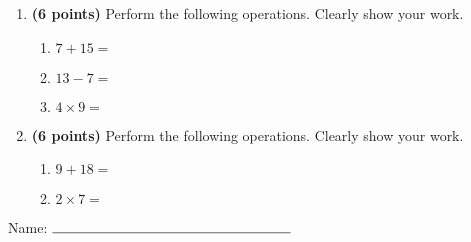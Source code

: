 \documentclass[12pt]{amsart}
\begin{document}
\newpage
\begin{enumerate}
\item {\bf (6 points)} 
 Perform the following operations. Clearly show your work. \begin{enumerate}


\def \a{7}\def \b{15}\def \apb{22}

 
\item $\a + \b = $

\vspace{2cm}
\def \a{13}\def \dif{6}\def \b{7}

 
\item $\a - \b = $

\vspace{2cm}
\def \a{4}\def \b{9}\def \ab{13}

 
\item $\a \times \b = $ 

\vspace{2cm}
\def \vshift{3}\def \hshift{4}\def \chang{1}\def \findval{5}\def \yval{1}

 
\end{enumerate}


\newpage
\item {\bf (6 points)} 
 Perform the following operations. Clearly show your work. \begin{enumerate}


\def \a{9}\def \b{18}\def \apb{27}

 
\item $\a + \b = $

\vspace{2cm}
\def \a{2}\def \b{7}\def \ab{9}

 
\item $\a \times \b = $ 

\vspace{2cm}
\def \vshift{-5}\def \hshift{-4}\def \chang{-1}\def \findval{-5}\def \yval{-3}

 
\end{enumerate}


\newpage\end{enumerate}\graphicspath{{/Users/jilan/Downloads/Randomizer/Randomizer/Sample Course/Sample Assessment 2/}}\setcounter{page}{1}


\thispagestyle{fancy}

 
\noindent Name: $\rule{6cm}{0.15mm}$

\vspace{.2cm}
\end{document}

